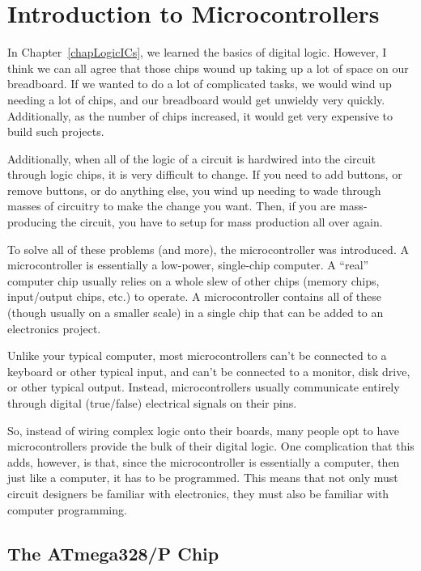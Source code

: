 \chapter{Introduction to Microcontrollers}
\label{chapMicrocontrollers}

In Chapter~\ref{chapLogicICs}, we learned the basics of digital logic.
However, I think we can all agree that those chips wound up taking up a lot of space on our breadboard.
If we wanted to do a lot of complicated tasks, we would wind up needing a lot of chips, and our breadboard would get unwieldy very quickly.
Additionally, as the number of chips increased, it would get very expensive to build such projects.

Additionally, when all of the logic of a circuit is hardwired into the circuit through logic chips, it is very difficult to change.
If you need to add buttons, or remove buttons, or do anything else, you wind up needing to wade through masses of circuitry to make the change you want.
Then, if you are mass-producing the circuit, you have to setup for mass production all over again.

To solve all of these problems (and more), the microcontroller was introduced.
A microcontroller is essentially a low-power, single-chip computer.
A ``real'' computer chip usually relies on a whole slew of other chips (memory chips, input/output chips, etc.) to operate.
A microcontroller contains all of these (though usually on a smaller scale) in a single chip that can be added to an electronics project.

Unlike your typical computer, most microcontrollers can't be connected to a keyboard or other typical input, and can't be connected to a monitor, disk drive, or other typical output.
Instead, microcontrollers usually communicate entirely through digital (true/false) electrical signals on their pins.

So, instead of wiring complex logic onto their boards, many people opt to have microcontrollers provide the bulk of their digital logic.
One complication that this adds, however, is that, since the microcontroller is essentially a computer, then just like a computer, it has to be programmed.
This means that not only must circuit designers be familiar with electronics, they must also be familiar with computer programming.

\section{The ATmega328/P Chip}

